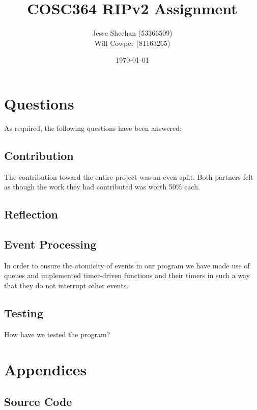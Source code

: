 \documentclass[11pt]{article} %
\title{COSC364 RIPv2 Assignment}
\date{\today}
\author{Jesse Sheehan (53366509)\\ Will Cowper (81163265)}
\begin{document}
\maketitle

\tableofcontents

\newpage



\section{Questions}

As required, the following questions have been answered:

\subsection{Contribution}
The contribution toward the entire project was an even split. Both partners felt as though the work they had contributed was worth 50\% each.

\subsection{Reflection}





\subsection{Event Processing}
In order to ensure the atomicity of events in our program we have made use of queues and implemented timer-driven functions and their timers in such a way that they do not  interrupt other events.   


\subsection{Testing}
How have we tested the program?

\newpage
\section{Appendices}

\subsection{Source Code}
\end{document}
